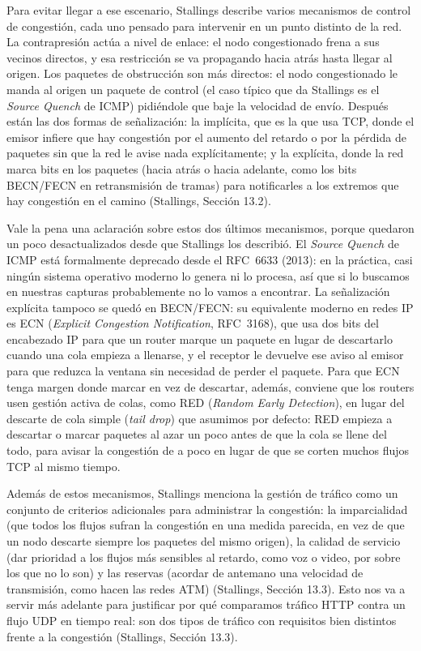 \documentclass[11pt,a4paper]{article}
\begin{document}
Para evitar llegar a ese escenario, Stallings describe varios mecanismos de control de congesti\'on, cada uno pensado para intervenir en un punto distinto de la red. La contrapresi\'on act\'ua a nivel de enlace: el nodo congestionado frena a sus vecinos directos, y esa restricci\'on se va propagando hacia atr\'as hasta llegar al origen. Los paquetes de obstrucci\'on son m\'as directos: el nodo congestionado le manda al origen un paquete de control (el caso t\'ipico que da Stallings es el \textit{Source Quench} de ICMP) pidi\'endole que baje la velocidad de env\'io. Despu\'es est\'an las dos formas de se\~nalizaci\'on: la impl\'icita, que es la que usa TCP, donde el emisor infiere que hay congesti\'on por el aumento del retardo o por la p\'erdida de paquetes sin que la red le avise nada expl\'icitamente; y la expl\'icita, donde la red marca bits en los paquetes (hacia atr\'as o hacia adelante, como los bits BECN/FECN en retransmisi\'on de tramas) para notificarles a los extremos que hay congesti\'on en el camino (Stallings, Secci\'on 13.2).

Vale la pena una aclaraci\'on sobre estos dos \'ultimos mecanismos, porque quedaron un poco desactualizados desde que Stallings los describi\'o. El \textit{Source Quench} de ICMP est\'a formalmente deprecado desde el RFC~6633 (2013): en la pr\'actica, casi ning\'un sistema operativo moderno lo genera ni lo procesa, as\'i que si lo buscamos en nuestras capturas probablemente no lo vamos a encontrar. La se\~nalizaci\'on expl\'icita tampoco se qued\'o en BECN/FECN: su equivalente moderno en redes IP es ECN (\textit{Explicit Congestion Notification}, RFC~3168), que usa dos bits del encabezado IP para que un router marque un paquete en lugar de descartarlo cuando una cola empieza a llenarse, y el receptor le devuelve ese aviso al emisor para que reduzca la ventana sin necesidad de perder el paquete. Para que ECN tenga margen donde marcar en vez de descartar, adem\'as, conviene que los routers usen gesti\'on activa de colas, como RED (\textit{Random Early Detection}), en lugar del descarte de cola simple (\textit{tail drop}) que asumimos por defecto: RED empieza a descartar o marcar paquetes al azar un poco antes de que la cola se llene del todo, para avisar la congesti\'on de a poco en lugar de que se corten muchos flujos TCP al mismo tiempo.

Adem\'as de estos mecanismos, Stallings menciona la gesti\'on de tr\'afico como un conjunto de criterios adicionales para administrar la congesti\'on: la imparcialidad (que todos los flujos sufran la congesti\'on en una medida parecida, en vez de que un nodo descarte siempre los paquetes del mismo origen), la calidad de servicio (dar prioridad a los flujos m\'as sensibles al retardo, como voz o video, por sobre los que no lo son) y las reservas (acordar de antemano una velocidad de transmisi\'on, como hacen las redes ATM) (Stallings, Secci\'on 13.3). Esto nos va a servir m\'as adelante para justificar por qu\'e comparamos tr\'afico HTTP contra un flujo UDP en tiempo real: son dos tipos de tr\'afico con requisitos bien distintos frente a la congesti\'on (Stallings, Secci\'on 13.3).
\end{document}
